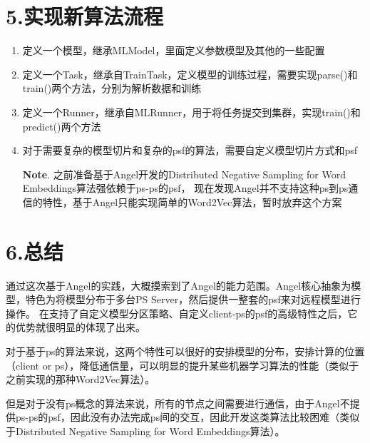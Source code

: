 \documentclass{article}
\begin{document}
\section{5.\hspace*{0.5em}实现新算法流程}\label{section}%

\begin{enumerate}[noitemsep,topsep=\mdcompacttopsep]%

\item{}定义一个模型，继承MLModel，里面定义参数模型及其他的一些配置%

\item{}定义一个Task，继承自TrainTask，定义模型的训练过程，需要实现parse()和train()两个方法，分别为解析数据和训练%

\item{}定义一个Runner，继承自MLRunner，用于将任务提交到集群，实现train()和predict()两个方法%

\item{}对于需要复杂的模型切片和复杂的psf的算法，需要自定义模型切片方式和psf

\noindent{}\textbf{Note}.
之前准备基于Angel开发的Distributed Negative Sampling for Word Embeddings算法强依赖于ps-ps的psf，
现在发现Angel并不支持这种ps到ps通信的特性，基于Angel只能实现简单的Word2Vec算法，暂时放弃这个方案%
\end{enumerate}%

\section{6.\hspace*{0.5em}总结}\label{section}%

\noindent{}\hspace*{1em}\hspace*{1em}通过这次基于Angel的实践，大概摸索到了Angel的能力范围。Angel核心抽象为模型，特色为将模型分布于多台PS Server，然后提供一整套的psf来对远程模型进行操作。
在支持了自定义模型分区策略、自定义client-ps的psf的高级特性之后，它的优势就很明显的体现了出来。%

\hspace*{1em}\hspace*{1em}对于基于ps的算法来说，这两个特性可以很好的安排模型的分布，安排计算的位置（client or ps），降低通信量，可以明显的提升某些机器学习算法的性能（类似于之前实现的那种Word2Vec算法）。%

\hspace*{1em}\hspace*{1em}但是对于没有ps概念的算法来说，所有的节点之间需要进行通信，由于Angel不提供ps-ps的psf，因此没有办法完成ps间的交互，因此开发这类算法比较困难（类似于Distributed Negative Sampling for Word Embeddings算法）。%
\end{document}
